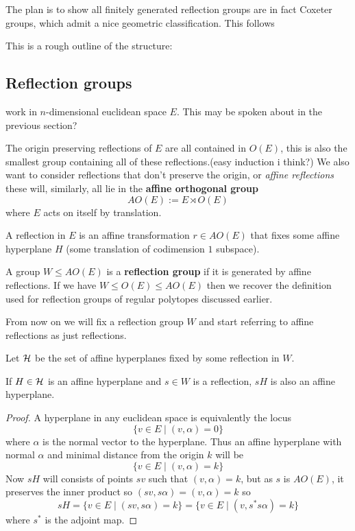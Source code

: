 \documentclass[../main.tex]{subfiles}
\begin{document}
The plan is to show all finitely generated reflection groups are in fact Coxeter groups, which admit a nice geometric classification. This follows\cite{Humphreys1990}

This is a rough outline of the structure:

\subsection{Reflection groups}

work in $n$-dimensional euclidean space $E$. This may be spoken about in the previous section?

The origin preserving reflections of $E$ are all contained in $O(E)$, this is also the smallest group containing all of these reflections.\citationneeded (easy induction i think?)
We also want to consider reflections that don't preserve the origin, or \textit{affine reflections} these will, similarly, all lie in the \textbf{affine orthogonal group} \[
AO(E) := E\rtimes O(E)
\] where $E$ acts on itself by translation.

A reflection in $E$ is an affine transformation $r\in AO(E)$ that  fixes some affine hyperplane $H$ (some translation of codimension $1$ subspace).

A group $W\leq AO(E)$ is a \textbf{reflection group} if it is generated by affine reflections. If we have $W\leq O(E)\leq AO(E)$ then we recover the definition used for reflection groups of regular polytopes discussed earlier.

From now on we will fix a reflection group $W$ and start referring to affine reflections as just reflections.

Let $\mathcal{H}$ be the set of affine hyperplanes fixed by some reflection in $W$.

\begin{lemma}
    If $H\in\mathcal{H}$ is an affine hyperplane and $s\in W$ is a reflection, $sH$ is also an affine hyperplane.
    \begin{proof}
        A hyperplane in any euclidean space is equivalently the locus\[
            \{v\in E \mid (v,\alpha)=0\}
        \] where $\alpha$ is the normal vector to the hyperplane. Thus an affine hyperplane with normal $\alpha$ and minimal distance from the origin $k$ will be \[
            \{v\in E \mid (v,\alpha)=k\}
        \] Now $sH$ will consists of points $sv$ such that $(v,\alpha)=k$, but as $s$ is $AO(E)$, it preserves the inner product so $(sv,s\alpha)=(v,\alpha)=k$ so\[
            sH = \{v\in E \mid (sv,s\alpha) = k\} = \{v\in E \mid (v,s^*s\alpha) = k\}
        \] where $s^*$ is the adjoint map.
    \end{proof}
\end{lemma}
\end{document}

